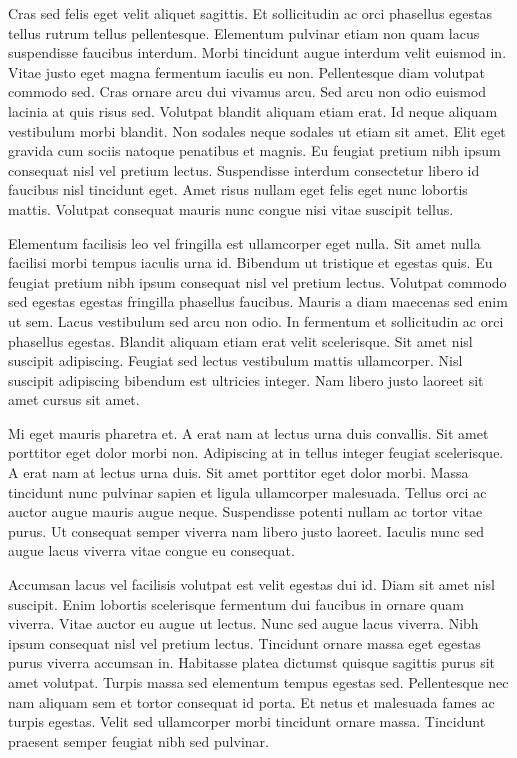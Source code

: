 \documentclass[11pt,a4paper]{article}
\begin{document}
Cras sed felis eget velit aliquet sagittis. Et sollicitudin ac orci phasellus egestas tellus rutrum tellus pellentesque. Elementum pulvinar etiam non quam lacus suspendisse faucibus interdum. Morbi tincidunt augue interdum velit euismod in. Vitae justo eget magna fermentum iaculis eu non. Pellentesque diam volutpat commodo sed. Cras ornare arcu dui vivamus arcu. Sed arcu non odio euismod lacinia at quis risus sed. Volutpat blandit aliquam etiam erat. Id neque aliquam vestibulum morbi blandit. Non sodales neque sodales ut etiam sit amet. Elit eget gravida cum sociis natoque penatibus et magnis. Eu feugiat pretium nibh ipsum consequat nisl vel pretium lectus. Suspendisse interdum consectetur libero id faucibus nisl tincidunt eget. Amet risus nullam eget felis eget nunc lobortis mattis. Volutpat consequat mauris nunc congue nisi vitae suscipit tellus.

Elementum facilisis leo vel fringilla est ullamcorper eget nulla. Sit amet nulla facilisi morbi tempus iaculis urna id. Bibendum ut tristique et egestas quis. Eu feugiat pretium nibh ipsum consequat nisl vel pretium lectus. Volutpat commodo sed egestas egestas fringilla phasellus faucibus. Mauris a diam maecenas sed enim ut sem. Lacus vestibulum sed arcu non odio. In fermentum et sollicitudin ac orci phasellus egestas. Blandit aliquam etiam erat velit scelerisque. Sit amet nisl suscipit adipiscing. Feugiat sed lectus vestibulum mattis ullamcorper. Nisl suscipit adipiscing bibendum est ultricies integer. Nam libero justo laoreet sit amet cursus sit amet.

Mi eget mauris pharetra et. A erat nam at lectus urna duis convallis. Sit amet porttitor eget dolor morbi non. Adipiscing at in tellus integer feugiat scelerisque. A erat nam at lectus urna duis. Sit amet porttitor eget dolor morbi. Massa tincidunt nunc pulvinar sapien et ligula ullamcorper malesuada. Tellus orci ac auctor augue mauris augue neque. Suspendisse potenti nullam ac tortor vitae purus. Ut consequat semper viverra nam libero justo laoreet. Iaculis nunc sed augue lacus viverra vitae congue eu consequat.

Accumsan lacus vel facilisis volutpat est velit egestas dui id. Diam sit amet nisl suscipit. Enim lobortis scelerisque fermentum dui faucibus in ornare quam viverra. Vitae auctor eu augue ut lectus. Nunc sed augue lacus viverra. Nibh ipsum consequat nisl vel pretium lectus. Tincidunt ornare massa eget egestas purus viverra accumsan in. Habitasse platea dictumst quisque sagittis purus sit amet volutpat. Turpis massa sed elementum tempus egestas sed. Pellentesque nec nam aliquam sem et tortor consequat id porta. Et netus et malesuada fames ac turpis egestas. Velit sed ullamcorper morbi tincidunt ornare massa. Tincidunt praesent semper feugiat nibh sed pulvinar.
\end{document}
